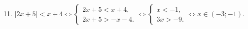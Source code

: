 11. $|2x+5|<x+4\Leftrightarrow\begin{cases}2x+5<x+4,\\ 2x+5>-x-4.\end{cases}
\Leftrightarrow\begin{cases}x<-1,\\ 3x>-9.\end{cases}\Leftrightarrow x\in (-3;-1).$\\
